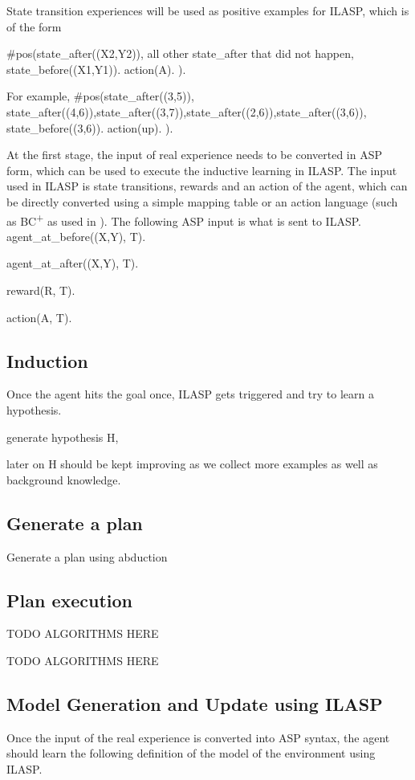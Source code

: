 State transition experiences will be used as positive examples for ILASP, which is of the form

#pos({state_after((X2,Y2))}, {all other state_after that did not happen}, {state_before((X1,Y1)). action(A). }).

For example, 
#pos({state_after((3,5))}, {state_after((4,6)),state_after((3,7)),state_after((2,6)),state_after((3,6))}, {state_before((3,6)). action(up). }).

At the first stage,  the input of real experience needs to be converted in ASP form, which can be used to execute the inductive learning in ILASP. The input used in ILASP is state transitions, 
rewards and an action of the agent, which can be directly converted using a simple mapping table or an action language (such as BC\textsuperscript{+} as used in \cite{Ferreira2017}). 
The following ASP input is what is sent to ILASP. \\

agent\_at\_before((X,Y), T).

agent\_at\_after((X,Y), T).

reward(R, T).

action(A, T).

\subsection{Induction}
\label{induction}
Once the agent hits the goal once, ILASP gets triggered and try to learn a hypothesis. 

generate hypothesis H,

later on H should be kept improving as we collect more examples as well as background knowledge.

\subsection{Generate a plan}
\label{Generate a plan}

Generate a plan using abduction

\subsection{Plan execution}
\label{Plan execution}
TODO ALGORITHMS HERE


TODO ALGORITHMS HERE



\subsection{Model Generation and Update using ILASP}
\label{model_generation_and_update}
Once the input of the real experience is converted into ASP syntax, the agent should learn the following definition of the model of the environment using ILASP. \\

